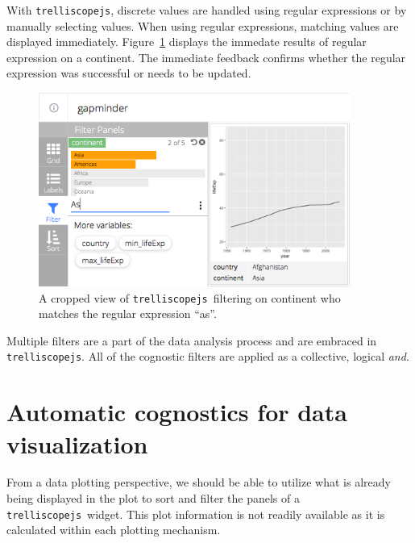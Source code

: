 \documentclass[stat,dissertation]{puthesis}\usepackage[]{graphicx}\usepackage{xcolor}
\newcommand{\pkg}[1]{\texttt{#1}}
\newcommand{\trelliscopejs}{\pkg{trelliscopejs}}
\begin{document}
With \trelliscopejs, discrete values are handled using regular expressions or by manually selecting values.  When using regular expressions, matching values are displayed immediately.  Figure~\ref{fig:gap_regex} displays the immedate results of regular expression on a continent.  The immediate feedback confirms whether the regular expression was successful or needs to be updated.

\begin{figure}[H]
  \label{fig:gap_regex}
  \centering
  \includegraphics[height=2.5in]{./figs/tjs_filter_as.png}
  \caption{A cropped view of \trelliscopejs~filtering on continent who matches the regular expression ``as''.}
\end{figure}


Multiple filters are a part of the data analysis process and are embraced in \trelliscopejs.  All of the cognostic filters are applied as a collective, logical \emph{and}.


\section{Automatic cognostics for data visualization}

From a data plotting perspective, we should be able to utilize what is already being displayed in the plot to sort and filter the panels of a \trelliscopejs~widget.  This plot information is not readily available as it is calculated within each plotting mechanism.
\end{document}
